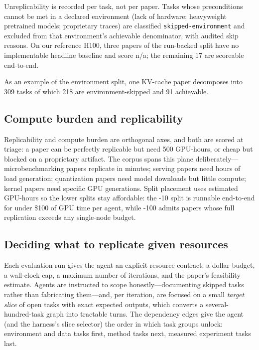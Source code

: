 \documentclass{article}
\begin{document}
Unreplicability is recorded per task, not per paper. Tasks whose
preconditions cannot be met in a declared environment (lack of hardware;
heavyweight pretrained models; proprietary traces) are classified
\texttt{skipped-environment} and excluded from that environment's achievable
denominator, with audited skip reasons.
On our reference H100, three papers of the run-backed split have no
implementable headline baseline and score n/a; the remaining 17 are scoreable
end-to-end.

As an example of the environment split, one KV-cache paper decomposes into
309 tasks of which 218 are environment-skipped and 91 achievable.

\subsection{Compute burden and replicability}

Replicability and compute burden are orthogonal axes, and both are scored at
triage: a paper can be perfectly replicable but need 500 GPU-hours, or cheap
but blocked on a proprietary artifact. The corpus spans this plane
deliberately---microbenchmarking papers replicate in minutes; serving papers
need hours of load generation; quantization papers need model downloads but
little compute; kernel papers need specific GPU generations. Split placement
uses estimated GPU-hours so the lower splits stay affordable: the -10 split is
runnable end-to-end for under \$100 of GPU time per agent, while -100 admits
papers whose full replication exceeds any single-node budget.

\subsection{Deciding what to replicate given resources}

Each evaluation run gives the agent an explicit resource contract: a dollar
budget, a wall-clock cap, a maximum number of iterations, and the paper's
feasibility estimate. Agents are instructed to scope honestly---documenting
skipped tasks rather than fabricating them---and, per iteration, are focused
on a small \emph{target slice} of open tasks with exact expected outputs,
which converts a several-hundred-task graph into tractable turns. The
dependency edges give the agent (and the harness's slice selector) the order
in which task groups unlock: environment and data tasks first, method tasks
next, measured experiment tasks last.
\end{document}
